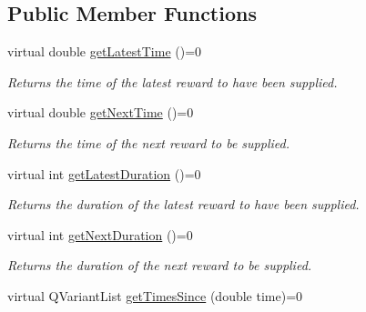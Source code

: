 \subsection*{Public Member Functions}
\begin{DoxyCompactItemize}
\item 
\hypertarget{class_picto_1_1_reward_reader_a507ac1e152e02e4f4c1e0d2f510c652c}{virtual double \hyperlink{class_picto_1_1_reward_reader_a507ac1e152e02e4f4c1e0d2f510c652c}{get\-Latest\-Time} ()=0}\label{class_picto_1_1_reward_reader_a507ac1e152e02e4f4c1e0d2f510c652c}

\begin{DoxyCompactList}\small\item\em Returns the time of the latest reward to have been supplied. \end{DoxyCompactList}\item 
\hypertarget{class_picto_1_1_reward_reader_a993319a9b8fcb136faf23ec7a4bed7ee}{virtual double \hyperlink{class_picto_1_1_reward_reader_a993319a9b8fcb136faf23ec7a4bed7ee}{get\-Next\-Time} ()=0}\label{class_picto_1_1_reward_reader_a993319a9b8fcb136faf23ec7a4bed7ee}

\begin{DoxyCompactList}\small\item\em Returns the time of the next reward to be supplied. \end{DoxyCompactList}\item 
\hypertarget{class_picto_1_1_reward_reader_aa678cac031bd53ebbdc5dc7633957cdc}{virtual int \hyperlink{class_picto_1_1_reward_reader_aa678cac031bd53ebbdc5dc7633957cdc}{get\-Latest\-Duration} ()=0}\label{class_picto_1_1_reward_reader_aa678cac031bd53ebbdc5dc7633957cdc}

\begin{DoxyCompactList}\small\item\em Returns the duration of the latest reward to have been supplied. \end{DoxyCompactList}\item 
\hypertarget{class_picto_1_1_reward_reader_a37826c973b9350f8a8450e04e40125dc}{virtual int \hyperlink{class_picto_1_1_reward_reader_a37826c973b9350f8a8450e04e40125dc}{get\-Next\-Duration} ()=0}\label{class_picto_1_1_reward_reader_a37826c973b9350f8a8450e04e40125dc}

\begin{DoxyCompactList}\small\item\em Returns the duration of the next reward to be supplied. \end{DoxyCompactList}\item 
\hypertarget{class_picto_1_1_reward_reader_ac5cbb012865d274c25a3def3c0ef150c}{virtual Q\-Variant\-List \hyperlink{class_picto_1_1_reward_reader_ac5cbb012865d274c25a3def3c0ef150c}{get\-Times\-Since} (double time)=0}\label{class_picto_1_1_reward_reader_ac5cbb012865d274c25a3def3c0ef150c}


\end{DoxyCompactItemize}
